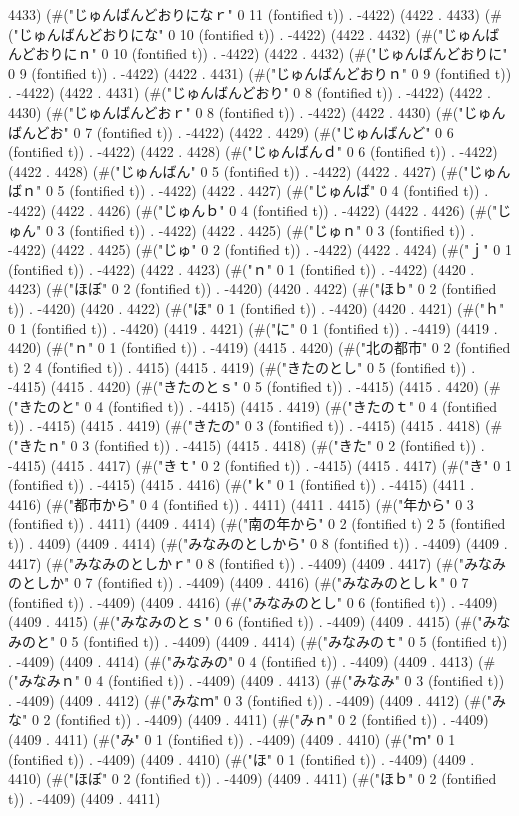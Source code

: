 4433) (#("じゅんばんどおりになｒ" 0 11 (fontified t)) . -4422) (4422 . 4433) (#("じゅんばんどおりにな" 0 10 (fontified t)) . -4422) (4422 . 4432) (#("じゅんばんどおりにｎ" 0 10 (fontified t)) . -4422) (4422 . 4432) (#("じゅんばんどおりに" 0 9 (fontified t)) . -4422) (4422 . 4431) (#("じゅんばんどおりｎ" 0 9 (fontified t)) . -4422) (4422 . 4431) (#("じゅんばんどおり" 0 8 (fontified t)) . -4422) (4422 . 4430) (#("じゅんばんどおｒ" 0 8 (fontified t)) . -4422) (4422 . 4430) (#("じゅんばんどお" 0 7 (fontified t)) . -4422) (4422 . 4429) (#("じゅんばんど" 0 6 (fontified t)) . -4422) (4422 . 4428) (#("じゅんばんｄ" 0 6 (fontified t)) . -4422) (4422 . 4428) (#("じゅんばん" 0 5 (fontified t)) . -4422) (4422 . 4427) (#("じゅんばｎ" 0 5 (fontified t)) . -4422) (4422 . 4427) (#("じゅんば" 0 4 (fontified t)) . -4422) (4422 . 4426) (#("じゅんｂ" 0 4 (fontified t)) . -4422) (4422 . 4426) (#("じゅん" 0 3 (fontified t)) . -4422) (4422 . 4425) (#("じゅｎ" 0 3 (fontified t)) . -4422) (4422 . 4425) (#("じゅ" 0 2 (fontified t)) . -4422) (4422 . 4424) (#("ｊ" 0 1 (fontified t)) . -4422) (4422 . 4423) (#("ｎ" 0 1 (fontified t)) . -4422) (4420 . 4423) (#("ほぼ" 0 2 (fontified t)) . -4420) (4420 . 4422) (#("ほｂ" 0 2 (fontified t)) . -4420) (4420 . 4422) (#("ほ" 0 1 (fontified t)) . -4420) (4420 . 4421) (#("ｈ" 0 1 (fontified t)) . -4420) (4419 . 4421) (#("に" 0 1 (fontified t)) . -4419) (4419 . 4420) (#("ｎ" 0 1 (fontified t)) . -4419) (4415 . 4420) (#("北の都市" 0 2 (fontified t) 2 4 (fontified t)) . 4415) (4415 . 4419) (#("きたのとし" 0 5 (fontified t)) . -4415) (4415 . 4420) (#("きたのとｓ" 0 5 (fontified t)) . -4415) (4415 . 4420) (#("きたのと" 0 4 (fontified t)) . -4415) (4415 . 4419) (#("きたのｔ" 0 4 (fontified t)) . -4415) (4415 . 4419) (#("きたの" 0 3 (fontified t)) . -4415) (4415 . 4418) (#("きたｎ" 0 3 (fontified t)) . -4415) (4415 . 4418) (#("きた" 0 2 (fontified t)) . -4415) (4415 . 4417) (#("きｔ" 0 2 (fontified t)) . -4415) (4415 . 4417) (#("き" 0 1 (fontified t)) . -4415) (4415 . 4416) (#("ｋ" 0 1 (fontified t)) . -4415) (4411 . 4416) (#("都市から" 0 4 (fontified t)) . 4411) (4411 . 4415) (#("年から" 0 3 (fontified t)) . 4411) (4409 . 4414) (#("南の年から" 0 2 (fontified t) 2 5 (fontified t)) . 4409) (4409 . 4414) (#("みなみのとしから" 0 8 (fontified t)) . -4409) (4409 . 4417) (#("みなみのとしかｒ" 0 8 (fontified t)) . -4409) (4409 . 4417) (#("みなみのとしか" 0 7 (fontified t)) . -4409) (4409 . 4416) (#("みなみのとしｋ" 0 7 (fontified t)) . -4409) (4409 . 4416) (#("みなみのとし" 0 6 (fontified t)) . -4409) (4409 . 4415) (#("みなみのとｓ" 0 6 (fontified t)) . -4409) (4409 . 4415) (#("みなみのと" 0 5 (fontified t)) . -4409) (4409 . 4414) (#("みなみのｔ" 0 5 (fontified t)) . -4409) (4409 . 4414) (#("みなみの" 0 4 (fontified t)) . -4409) (4409 . 4413) (#("みなみｎ" 0 4 (fontified t)) . -4409) (4409 . 4413) (#("みなみ" 0 3 (fontified t)) . -4409) (4409 . 4412) (#("みなｍ" 0 3 (fontified t)) . -4409) (4409 . 4412) (#("みな" 0 2 (fontified t)) . -4409) (4409 . 4411) (#("みｎ" 0 2 (fontified t)) . -4409) (4409 . 4411) (#("み" 0 1 (fontified t)) . -4409) (4409 . 4410) (#("ｍ" 0 1 (fontified t)) . -4409) (4409 . 4410) (#("ほ" 0 1 (fontified t)) . -4409) (4409 . 4410) (#("ほぼ" 0 2 (fontified t)) . -4409) (4409 . 4411) (#("ほｂ" 0 2 (fontified t)) . -4409) (4409 . 4411) 